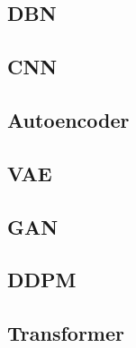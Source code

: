 \documentclass{myclass}
\begin{document}
\subsection{DBN}
\subsection{CNN}
\subsection{Autoencoder}
\subsection{VAE}
\subsection{GAN}
\subsection{DDPM}
\subsection{Transformer}


\end{document}
